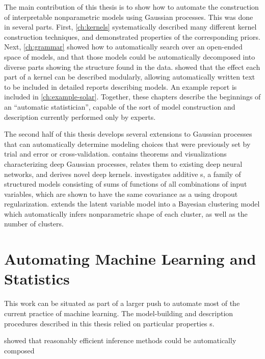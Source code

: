 The main contribution of this thesis is to show how to automate the construction of interpretable nonparametric models using Gaussian processes.
This was done in several parts.
First, \cref{ch:kernels} systematically described many different kernel construction techniques, and demonstrated properties of the corresponding \gp{} priors.
Next, \cref{ch:grammar} showed how to automatically search over an open-ended space of \gp{} models, and that those models could be automatically decomposed into diverse parts showing the structure found in the data.
 showed that the effect each part of a kernel can be described modularly, allowing automatically written text to be included in detailed reports describing \gp{} models.
An example report is included in \cref{ch:example-solar}.
Together, these chapters describe the beginnings of an ``automatic statistician'', capable of the sort of model construction and description currently performed only by experts.

The second half of this thesis develops several extensions to Gaussian processes that can automatically determine modeling choices that were previously set by trial and error or cross-validation.
 contains theorems and visualizations characterizing deep Gaussian processes, relates them to existing deep neural networks, and derives novel deep kernels.
 investigates additive \gp{}s, a family of structured models consisting of sums of functions of all combinations of input variables, which are shown to have the same covariance as a \gp{} using dropout regularization.
 extends the \gp{} latent variable model into a Bayesian clustering model which automatically infers nonparametric shape of each cluster, as well as the number of clusters.




\section{Automating Machine Learning and Statistics}

This work can be situated as part of a larger push to automate most of the current practice of machine learning.
The model-building and description procedures described in this thesis relied on particular properties \gp{}s.

\citet{roger-grosse-thesis} showed that reasonably efficient inference methods could be automatically composed

